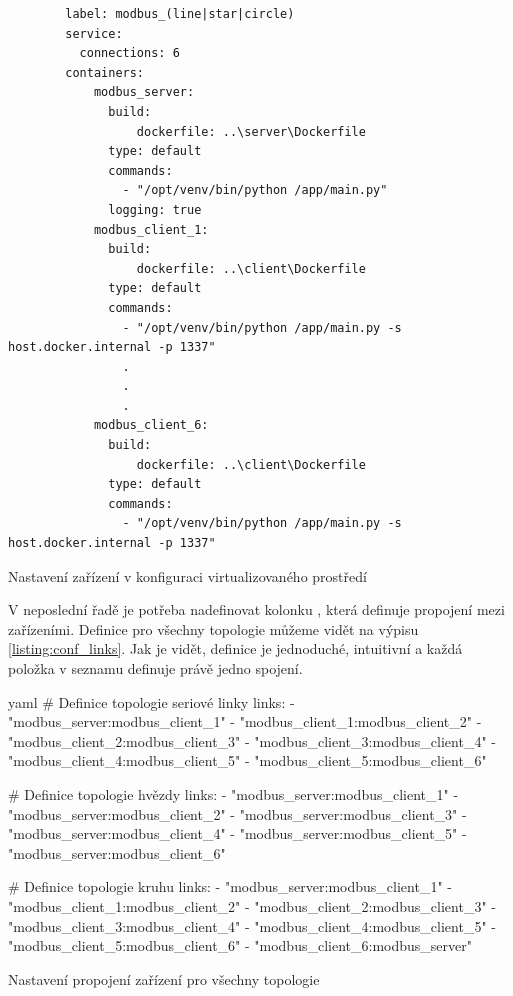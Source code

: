 \begin{listing}[htbp]
    \centering
    \begin{verbatim}
        label: modbus_(line|star|circle)
        service:
          connections: 6
        containers:
            modbus_server:
              build: 
                  dockerfile: ..\server\Dockerfile
              type: default
              commands:
                - "/opt/venv/bin/python /app/main.py"
              logging: true
            modbus_client_1:
              build: 
                  dockerfile: ..\client\Dockerfile
              type: default
              commands:
                - "/opt/venv/bin/python /app/main.py -s host.docker.internal -p 1337"
                .
                .
                .
            modbus_client_6:
              build: 
                  dockerfile: ..\client\Dockerfile
              type: default
              commands:
                - "/opt/venv/bin/python /app/main.py -s host.docker.internal -p 1337"
    \end{verbatim}
\caption{Nastavení zařízení v konfiguraci virtualizovaného prostředí}
\label{listing:conf_devices}
\end{listing}

V neposlední řadě je potřeba nadefinovat kolonku , která definuje propojení mezi zařízeními. Definice pro všechny topologie můžeme vidět na výpisu \ref{listing:conf_links}. Jak je vidět, definice je jednoduché, intuitivní a každá položka v seznamu definuje právě jedno spojení.

\begin{listing}[htbp]
    \centering
    \begin{cminted}[breaklines,autogobble, fontsize=\footnotesize]{yaml}
# Definice topologie seriové linky
links:
- "modbus_server:modbus_client_1"    
- "modbus_client_1:modbus_client_2"    
- "modbus_client_2:modbus_client_3"    
- "modbus_client_3:modbus_client_4"    
- "modbus_client_4:modbus_client_5"    
- "modbus_client_5:modbus_client_6"

# Definice topologie hvězdy
links:
- "modbus_server:modbus_client_1"    
- "modbus_server:modbus_client_2"    
- "modbus_server:modbus_client_3"    
- "modbus_server:modbus_client_4"    
- "modbus_server:modbus_client_5"    
- "modbus_server:modbus_client_6"

# Definice topologie kruhu
links:
- "modbus_server:modbus_client_1"    
- "modbus_client_1:modbus_client_2"    
- "modbus_client_2:modbus_client_3"    
- "modbus_client_3:modbus_client_4"    
- "modbus_client_4:modbus_client_5"    
- "modbus_client_5:modbus_client_6"
- "modbus_client_6:modbus_server"
    \end{cminted}
\caption{Nastavení propojení zařízení pro všechny topologie}
\label{listing:conf_links}
\end{listing}

